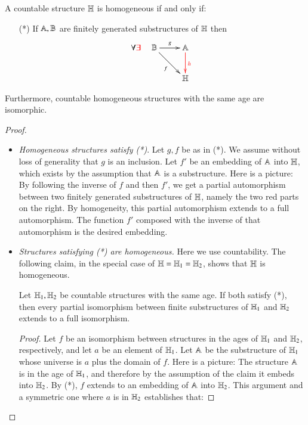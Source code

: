 \begin{lemma}\label{thm:age-is-all} A countable structure $\mathbb H$ is homogeneous if and only if:
	\begin{itemize}
		\item[(*)] \label{it:embeddings-extend} If $\mathbb A, \mathbb B$ are finitely generated substructures of $\mathbb H$ then
		\begin{align*}
		\forall \red{\exists}	\quad \xymatrix{ \structb \ar_f[dr] \ar^g[r] & \structa \ar@[red][d]^{\red h} \\ & \structh}
		\end{align*}
			\end{itemize}
Furthermore, countable homogeneous structures with the same age are isomorphic. 
\end{lemma} 
\begin{proof}\ 
\begin{itemize}
		\item \emph{Homogeneous structures satisfy (*)}. 	 Let $g,f$ be as in (*). We assume without loss of generality that $g$ is an inclusion. Let $f'$ be an embedding of $\mathbb A$ into $\mathbb H$, which exists by the assumption that $\mathbb A$ is a substructure. Here is a picture: 
		\mypic{80}
		By following the inverse of $f$ and then $f'$, we get a partial automorphism between two finitely generated substructures of $\mathbb H$, namely the two red parts on the right. By homogeneity, this partial automorphism extends to a full automorphism. The function $f'$ composed with the inverse of that automorphism is the desired embedding.	
		\item \emph{Structures satisfying (*) are homogeneous.} Here we use countability. The following claim, in the special case of $\mathbb H = \mathbb H_1 = \mathbb H_2$, shows that $\mathbb H$ is homogeneous. 
		\begin{claim}\label{claim:extend-to-isomorphism}
			Let $\mathbb H_1,\mathbb H_2$ be countable structures with the same age. If both satisfy (*), then every partial isomorphism between finite substructures of $\mathbb H_1$ and $\mathbb H_2$ extends to a full isomorphism.
		\end{claim} 
		\begin{proof}
			 Let $f$ be an isomorphism between structures in the ages of $\mathbb H_1$ and $\mathbb H_2$, respectively, and let $a$ be an element of $\mathbb H_1$. Let $\mathbb A$ be the substructure of $\mathbb H_1$ whose universe is $a$ plus the domain of $f$. Here is a picture:
			 \mypic{123}
			 The structure $\mathbb A$ is in the age of $\mathbb H_1$, and therefore by the assumption of the claim it embeds into $\mathbb H_2$. By (*), $f$ extends to an embedding of $\mathbb A$ into $\mathbb H_2$. This argument and a symmetric one where $a$ is in $\mathbb H_2$ establishes that:


\end{proof}
\end{itemize}
\end{proof}
